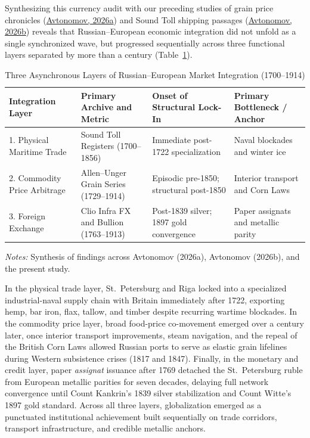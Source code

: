 \documentclass[11pt,a4paper]{article}
\begin{document}
Synthesizing this currency audit with our preceding studies of grain price chronicles (\href{https://doi.org}{Avtonomov, 2026a}) and Sound Toll shipping passages (\href{https://doi.org}{Avtonomov, 2026b}) reveals that Russian--European economic integration did not unfold as a single synchronized wave, but progressed sequentially across three functional layers separated by more than a century (Table~\ref{tab:three_layers}).

\begin{table}[htbp]
\centering
\caption{Three Asynchronous Layers of Russian--European Market Integration (1700--1914)}
\label{tab:three_layers}
\footnotesize
\setlength{\tabcolsep}{4pt}
\begin{tabular}{@{}p{}p{}p{}p{}@{}}
\toprule
\textbf{Integration Layer} & \textbf{Primary Archive and Metric} & \textbf{Onset of Structural Lock-In} & \textbf{Primary Bottleneck / Anchor} \tabularnewline
\midrule
1. Physical Maritime Trade & Sound Toll Registers (1700--1856) & Immediate post-1722 specialization & Naval blockades and winter ice \tabularnewline
2. Commodity Price Arbitrage & Allen--Unger Grain Series (1729--1914) & Episodic pre-1850; structural post-1850 & Interior transport and Corn Laws \tabularnewline
3. Foreign Exchange & Clio Infra FX and Bullion (1763--1913) & Post-1839 silver; 1897 gold convergence & Paper assignats and metallic parity \tabularnewline
\bottomrule
\end{tabular}
\vspace{1mm}
\begin{minipage}{\textwidth}
\footnotesize\emph{Notes:} Synthesis of findings across Avtonomov (2026a), Avtonomov (2026b), and the present study.
\end{minipage}
\end{table}


In the physical trade layer, St.~Petersburg and Riga locked into a specialized industrial-naval supply chain with Britain immediately after 1722, exporting hemp, bar iron, flax, tallow, and timber despite recurring wartime blockades. In the commodity price layer, broad food-price co-movement emerged over a century later, once interior transport improvements, steam navigation, and the repeal of the British Corn Laws allowed Russian ports to serve as elastic grain lifelines during Western subsistence crises (1817 and 1847). Finally, in the monetary and credit layer, paper \emph{assignat} issuance after 1769 detached the St.~Petersburg ruble from European metallic parities for seven decades, delaying full network convergence until Count Kankrin's 1839 silver stabilization and Count Witte's 1897 gold standard. Across all three layers, globalization emerged as a punctuated institutional achievement built sequentially on trade corridors, transport infrastructure, and credible metallic anchors.
\end{document}
